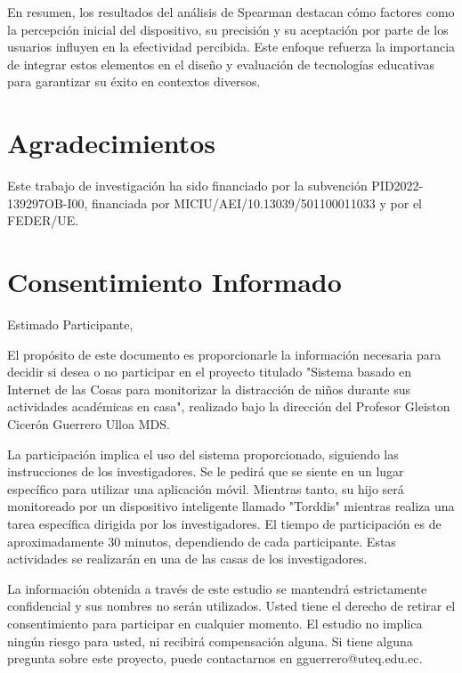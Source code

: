 \documentclass[a4paper,fleqn]{cas-sc}
\begin{document}
		En resumen, los resultados del análisis de Spearman destacan cómo factores como la percepción inicial del dispositivo, su precisión y su aceptación por parte de los usuarios influyen en la efectividad percibida. Este enfoque refuerza la importancia de integrar estos elementos en el diseño y evaluación de tecnologías educativas para garantizar su éxito en contextos diversos.
		
	\section*{Agradecimientos}
	
	Este trabajo de investigación ha sido financiado por la subvención PID2022-139297OB-I00, financiada por MICIU/AEI/10.13039/501100011033 y por el FEDER/UE.
	
	\printcredits
	
	
	
	
	
	\clearpage
	
	\appendix
	\section{Consentimiento Informado} \label{Appendix:InformedConsent}
	Estimado Participante,
	
	El propósito de este documento es proporcionarle la información necesaria para decidir si desea o no participar en el proyecto titulado "Sistema basado en Internet de las Cosas para monitorizar la distracción de niños durante sus actividades académicas en casa", realizado bajo la dirección del Profesor Gleiston Cicerón Guerrero Ulloa MDS.
	
	La participación implica el uso del sistema proporcionado, siguiendo las instrucciones de los investigadores. Se le pedirá que se siente en un lugar específico para utilizar una aplicación móvil. Mientras tanto, su hijo será monitoreado por un dispositivo inteligente llamado "Torddis" mientras realiza una tarea específica dirigida por los investigadores. El tiempo de participación es de aproximadamente 30 minutos, dependiendo de cada participante. Estas actividades se realizarán en una de las casas de los investigadores.
	
	La información obtenida a través de este estudio se mantendrá estrictamente confidencial y sus nombres no serán utilizados. Usted tiene el derecho de retirar el consentimiento para participar en cualquier momento. El estudio no implica ningún riesgo para usted, ni recibirá compensación alguna. Si tiene alguna pregunta sobre este proyecto, puede contactarnos en gguerrero@uteq.edu.ec.
	
\end{document}
